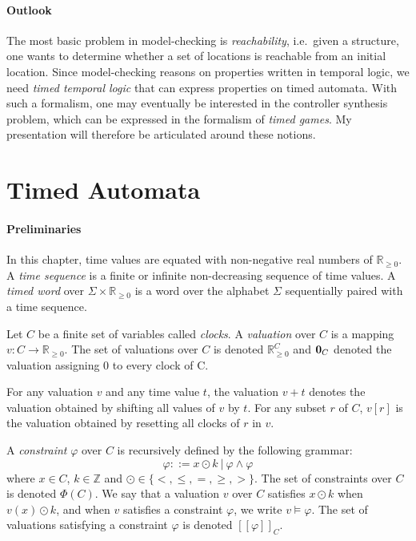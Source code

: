 \documentclass[11pt]{article}
\theoremstyle{definition}
\theoremstyle{remark}
\theoremstyle{definition}
\begin{document}
\paragraph{Outlook} The most basic problem in model-checking is \emph{reachability}, i.e.\ given a structure, one wants to determine whether a set of locations is reachable from an initial location. Since model-checking reasons on properties written in temporal logic, we need \emph{timed temporal logic} that can express properties on timed automata. With such a formalism, one may eventually be interested in the controller synthesis problem, which can be expressed in the formalism of \emph{timed games}. My presentation will therefore be articulated around these notions.

\section{Timed Automata}\label{sec:ta}
\paragraph{Preliminaries}\label{par:prelims}
In this chapter, time values are equated with non-negative real numbers of $\mathbb{R}_{\geq 0}$. A \emph{time sequence} is a finite or infinite non-decreasing sequence of time values.
A \emph{timed word} over $\Sigma \times \mathbb{R}_{\geq 0}$ is a word over the alphabet $\Sigma$ sequentially paired with a time sequence.

Let $C$ be a finite set of variables called \emph{clocks}. A \emph{valuation} over $C$ is a mapping $v \colon C \to \mathbb{R}_{\geq 0}$. The set of valuations over $C$ is denoted $\mathbb{R}_{\geq 0}^C$ and $\text{\bf 0}_C$ denoted the valuation assigning 0 to every clock of C.

For any valuation $v$ and any time value $t$, the valuation $v + t$ denotes the valuation obtained by shifting all values of $v$ by $t$. For any subset $r$ of $C$, $v[r]$ is the valuation obtained by resetting all clocks of $r$ in $v$.

A \emph{constraint} $\varphi$ over $C$ is recursively defined by the following grammar:
\begin{equation*}
	\varphi ::= x \odot k\ |\ \varphi \land \varphi
\end{equation*}
where $x\in C$, $k \in \mathbb{Z}$ and $\odot \in \{<, \leq, =, \geq, >\}$.
The set of constraints over $C$ is denoted $\Phi(C)$.
We say that a valuation $v$ over $C$ satisfies $x \odot k$ when $v(x) \odot k$, and when $v$ satisfies a constraint $\varphi$, we write $v \models \varphi$. The set of valuations satisfying a constraint $\varphi$ is denoted $[\![\varphi]\!]_C$.
\end{document}
